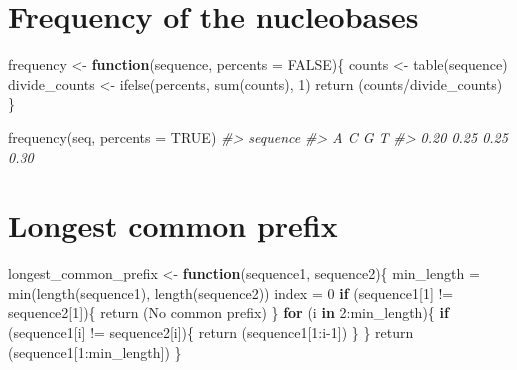 \documentclass[
]{book}
\newenvironment{Shaded}{\begin{snugshade}}{\end{snugshade}}
\newcommand{\AttributeTok}[1]{\textcolor[rgb]{0.77,0.63,0.00}{#1}}
\newcommand{\CommentTok}[1]{\textcolor[rgb]{0.56,0.35,0.01}{\textit{#1}}}
\newcommand{\ConstantTok}[1]{\textcolor[rgb]{0.00,0.00,0.00}{#1}}
\newcommand{\ControlFlowTok}[1]{\textcolor[rgb]{0.13,0.29,0.53}{\textbf{#1}}}
\newcommand{\DecValTok}[1]{\textcolor[rgb]{0.00,0.00,0.81}{#1}}
\newcommand{\FunctionTok}[1]{\textcolor[rgb]{0.00,0.00,0.00}{#1}}
\newcommand{\NormalTok}[1]{#1}
\newcommand{\OtherTok}[1]{\textcolor[rgb]{0.56,0.35,0.01}{#1}}
\newcommand{\SpecialCharTok}[1]{\textcolor[rgb]{0.00,0.00,0.00}{#1}}
\newcommand{\StringTok}[1]{\textcolor[rgb]{0.31,0.60,0.02}{#1}}
\begin{document}
\hypertarget{frequency-of-the-nucleobases}{%
\section{Frequency of the nucleobases}\label{frequency-of-the-nucleobases}}

\begin{Shaded}
\begin{Highlighting}[]
\NormalTok{frequency }\OtherTok{\textless{}{-}} \ControlFlowTok{function}\NormalTok{(sequence, }\AttributeTok{percents =} \ConstantTok{FALSE}\NormalTok{)\{}
\NormalTok{  counts }\OtherTok{\textless{}{-}} \FunctionTok{table}\NormalTok{(sequence)}
\NormalTok{  divide\_counts }\OtherTok{\textless{}{-}} \FunctionTok{ifelse}\NormalTok{(percents, }\FunctionTok{sum}\NormalTok{(counts), }\DecValTok{1}\NormalTok{)}
  \FunctionTok{return}\NormalTok{ (counts}\SpecialCharTok{/}\NormalTok{divide\_counts)}
\NormalTok{\}}
\end{Highlighting}
\end{Shaded}

\begin{Shaded}
\begin{Highlighting}[]
\FunctionTok{frequency}\NormalTok{(seq, }\AttributeTok{percents =} \ConstantTok{TRUE}\NormalTok{)}
\CommentTok{\#\textgreater{} sequence}
\CommentTok{\#\textgreater{}    A    C    G    T }
\CommentTok{\#\textgreater{} 0.20 0.25 0.25 0.30}
\end{Highlighting}
\end{Shaded}

\hypertarget{longest-common-prefix}{%
\section{Longest common prefix}\label{longest-common-prefix}}

\begin{Shaded}
\begin{Highlighting}[]
\NormalTok{longest\_common\_prefix }\OtherTok{\textless{}{-}} \ControlFlowTok{function}\NormalTok{(sequence1, sequence2)\{}
\NormalTok{  min\_length }\OtherTok{=} \FunctionTok{min}\NormalTok{(}\FunctionTok{length}\NormalTok{(sequence1), }\FunctionTok{length}\NormalTok{(sequence2))}
\NormalTok{  index }\OtherTok{=} \DecValTok{0}
  \ControlFlowTok{if}\NormalTok{ (sequence1[}\DecValTok{1}\NormalTok{] }\SpecialCharTok{!=}\NormalTok{ sequence2[}\DecValTok{1}\NormalTok{])\{}
    \FunctionTok{return}\NormalTok{ (}\StringTok{\textquotesingle{}No common prefix\textquotesingle{}}\NormalTok{)}
\NormalTok{  \}}
  \ControlFlowTok{for}\NormalTok{ (i }\ControlFlowTok{in} \DecValTok{2}\SpecialCharTok{:}\NormalTok{min\_length)\{}
    \ControlFlowTok{if}\NormalTok{ (sequence1[i] }\SpecialCharTok{!=}\NormalTok{ sequence2[i])\{}
      \FunctionTok{return}\NormalTok{ (sequence1[}\DecValTok{1}\SpecialCharTok{:}\NormalTok{i}\DecValTok{{-}1}\NormalTok{])}
\NormalTok{    \}}
\NormalTok{  \}}
  \FunctionTok{return}\NormalTok{ (sequence1[}\DecValTok{1}\SpecialCharTok{:}\NormalTok{min\_length])}
\NormalTok{\}}
\end{Highlighting}
\end{Shaded}
\end{document}
